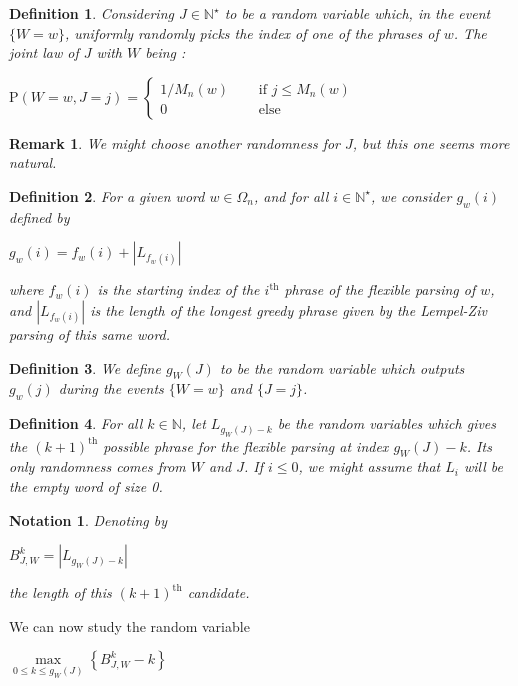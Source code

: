 \documentclass[11pt]{article}
\newtheorem{df}{Definition}
\newtheorem{rmk}{Remark}
\newtheorem{nota}{Notation}
\newcommand{\tf}[2]{#1/#2}
\newcommand{\proba}[1]{\text{P} \left( #1 \right) }
\newcommand{\centers}[2][2]{
    \begin{center}
    {#2}\end{center}}
\begin{document}
\begin{df}
Considering $J \in \mathbb{N}^{\star}$ to be a random
variable which, in the event $\{ W = w \}$,
uniformly randomly picks the index of
one of the phrases of $w$.
The joint law of $J$ with $W$ being :

\centers{$ \proba{ W=w, J=j } = 
                    \begin{cases}
                        \tf{1}{M_n(w)} \quad & \text{ if } j \leq M_n(w) \\
                        0 \qquad \qquad  &\text{ else }
                    \end{cases} $}
\end{df}

\begin{rmk}
We might choose another randomness for $J$, but this one seems
more natural.
\end{rmk}

\begin{df}
For a given word $w\in\Omega_n$, 
and for all $i\in\mathbb{N}^{\star}$, 
we consider $g_w(i)$ defined by
\centers{$g_w(i) = f_w(i) + |L_{f_w(i)}|$ }
where $f_w(i)$ is the starting index
of the $i^{\text{th}}$ phrase of the flexible parsing of $w$,
and $|L_{f_w(i)}|$ is the length of the longest greedy phrase
given by the Lempel-Ziv parsing of this same word.
\end{df}

\begin{df}
We define $g_{\scriptscriptstyle W}(J)$ to be the random variable which
outputs $g_w(j)$ during the events $\{ W=w \}$ and $\{ J = j \}$.
\end{df}

\begin{df}
For all $k \in \mathbb{N}$, let $L_{g_{\scriptscriptstyle W}(J) - k}$ be the random
variables which gives the $(k+1)^{\text{th}}$ possible phrase 
for the flexible parsing at index $g_{\scriptscriptstyle W}(J) - k$. 
Its only randomness comes from $W$ and $J$. 
If $i\leq 0$, we might assume that $L_i$ will be the empty word of 
size 0.
\end{df}


\begin{nota}
    Denoting by
    \centers{$B_{J, W}^k = | L_{g_{\scriptscriptstyle W}(J) - k} |$}
    \noindent the length of this $(k+1)^{\text{th}}$ candidate.
\end{nota}


\noindent
We can now study the random variable
    \centers{$ \underset{ 0 \leq k \leq g_{\scriptscriptstyle W}(J) }{ \max } 
                    \left\{ { B_{J, W}^k - k } \right\} $}
\end{document}
